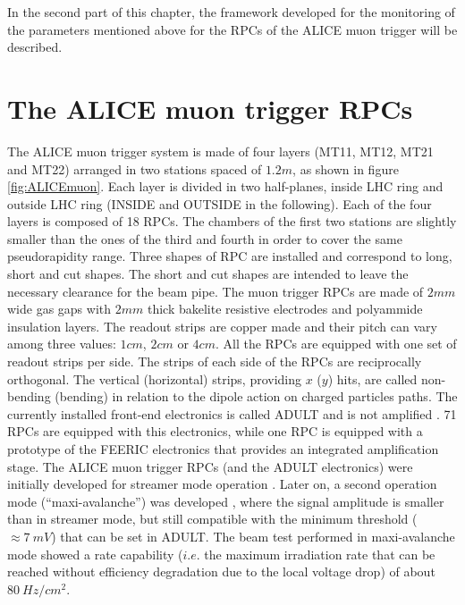 
In the second part of this chapter, the framework developed for the monitoring of the parameters mentioned above for the RPCs of the ALICE muon trigger will be described.

\section{The ALICE muon trigger RPCs}
The ALICE muon trigger system is made of four layers (MT11, MT12, MT21 and MT22) arranged in two stations spaced of $1.2m$, as shown in figure \ref{fig:ALICEmuon}.
Each layer is divided in two half-planes, inside LHC ring and outside LHC ring (INSIDE and OUTSIDE in the following).
Each of the four layers is composed of 18 RPCs.
The chambers of the first two stations are slightly smaller than the ones of the third and fourth in order to cover the same pseudorapidity range.
Three shapes of RPC are installed and correspond to long, short and cut shapes.
The short and cut shapes are intended to leave the necessary clearance for the beam pipe.
The muon trigger RPCs are made of $2mm$ wide gas gaps with $2mm$ thick bakelite resistive electrodes and polyammide insulation layers.
The readout strips are copper made and their pitch can vary among three values: $1cm$, $2cm$ or $4cm$.
All the RPCs are equipped with one set of readout strips per side.
The strips of each side of the RPCs are reciprocally orthogonal.
The vertical (horizontal) strips, providing $x$ ($y$) hits, are called non-bending (bending) in relation to the dipole action on charged particles paths.
The currently installed front-end electronics is called ADULT and is not amplified \cite{Dupieux:2003bw}.
71 RPCs are equipped with this electronics, while one RPC is equipped with a prototype of the FEERIC electronics \cite{Marchisone:2017bcb} that provides an integrated amplification stage.
The ALICE muon trigger RPCs (and the ADULT electronics) were initially developed for streamer mode operation \cite{Arnaldi:2000ub}. 
Later on, a second operation mode (“maxi-avalanche”) was developed \cite{Arnaldi:2006ii}, where the signal amplitude is smaller than in streamer mode, but still compatible with the minimum threshold ($\approx7\ mV$) that can be set in ADULT. 
The beam test performed in maxi-avalanche mode showed a rate capability ($i.e.$ the maximum irradiation rate that can be reached without efficiency degradation due to the local voltage drop) of about $80\ Hz/cm^2$. 

